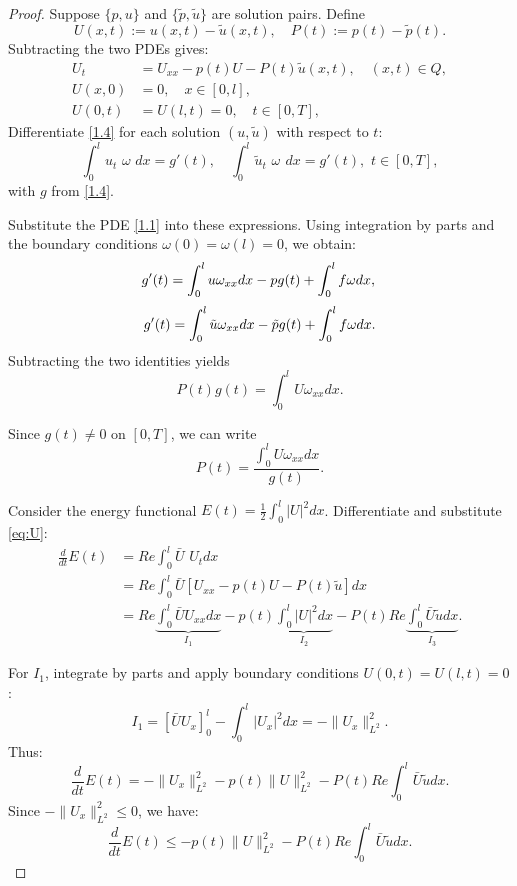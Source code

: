 \documentclass[reqno]{amsart}
\begin{document}
\begin{proof}
Suppose $\{p, u\}$ and $\{\tilde{p}, \tilde{u}\}$ are solution pairs. Define
\[
U(x,t) := u(x,t) - \tilde{u}(x,t), \quad P(t) := p(t) - \tilde{p}(t).
\]
Subtracting the two PDEs gives:
\begin{align}
    U_t &= U_{xx} - p(t) U - P(t) \tilde{u}(x,t), \quad (x,t) \in Q, \label{eq:U} \\
    U(x,0) &= 0, \quad x \in [0,l], \nonumber \\
    U(0,t) &= U(l,t) = 0, \quad t \in [0,T], \nonumber
\end{align}
Differentiate \eqref{1.4} for each solution $(u, \tilde{u})$ with respect to $t$:
\[
\int_0^l u_t \,\,\omega \,\, dx = g'(t), \quad\int_0^l \tilde{u}_t \,\, \omega \,\  dx = g'(t),\,\,  t \in [0,T],  
\]
with $g$ from \eqref{1.4}.

Substitute the PDE \eqref{1.1} into these expressions. Using integration by parts and the boundary conditions 
$\omega(0) = \omega(l)=0$, we obtain:
\[
g'(t) = \int_0^l u \omega_{xx} dx - pg(t) + \int_0^l f \omega dx,\\
\]
\[
g'(t) = \int_0^l \tilde{u} \omega_{xx} dx - \tilde{p}g(t) + \int_0^l f \omega dx.\\
\]
Subtracting the two identities yields
\begin{equation} \label{eq:Pg}
P(t) g(t) = \int_0^l U \omega_{xx}  dx.
\end{equation}

Since $g(t) \neq 0$ on $[0,T]$, we can write
\begin{equation} \label{eq:P}
P(t)  = \frac{\int_0^l U \omega_{xx}  dx}{g(t)}.
\end{equation}

Consider the energy functional $E(t) = \frac{1}{2} \int_0^l |U|^2 dx$. Differentiate and substitute \eqref{eq:U}:
\begin{align*}
\frac{d}{dt}E(t) &= Re\int_0^l \bar{U}\,\, U_t  dx \\
&= Re\int_0^l \bar{U} [U_{xx} - p(t)U - P(t)\tilde{u}]  dx \\
&= Re\underbrace{\int_0^l \bar{U} U_{xx}  dx}_{I_1} - p(t)\underbrace{\int_0^l |U|^2  dx}_{I_2} - P(t) Re \underbrace{\int_0^l \bar{U} \tilde{u}  dx}_{I_3}.
\end{align*}

For $I_1$, integrate by parts and apply boundary conditions $U(0,t) = U(l,t) = 0$:
\[
I_1 = \left[ \bar{U} U_x \right]_0^l - \int_0^l |U_x|^2  dx = - \|U_x\|_{L^2}^2.
\]
Thus:
\[
\frac{d}{dt}E(t) = -\|U_x\|_{L^2}^2 - p(t) \|U\|_{L^2}^2 - P(t) Re \int_0^l \bar{U} \tilde{u}  dx.
\]
Since $-\|U_x\|_{L^2}^2 \leq 0$, we have:
\begin{equation}\label{eq:E}
\frac{d}{dt}E(t) \leq -p(t) \|U\|_{L^2}^2 - P(t) Re\int_0^l \bar{U} \tilde{u}  dx.
\end{equation}


\end{proof}
\end{document}
